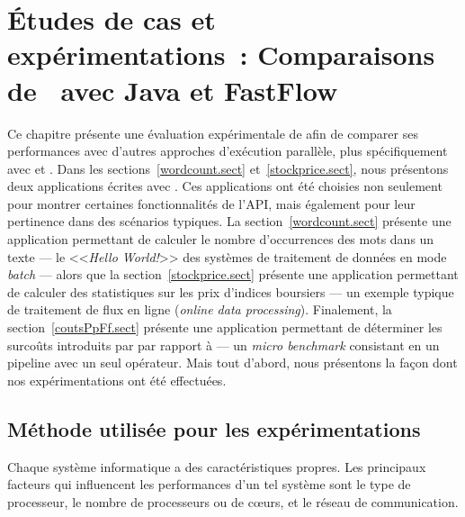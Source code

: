
\chapter{\'Etudes de cas et exp\'erimentations~: Comparaisons de \ppff\ avec Java et FastFlow}
\label{experiences.chap}


Ce chapitre pr\'esente une \'evaluation exp\'erimentale de  afin de comparer ses performances avec d'autres approches d'ex\'ecution parall\`ele, plus sp\'ecifiquement avec  et .
%
Dans les sections~\ref{wordcount.sect} et~\ref{stockprice.sect}, nous pr\'esentons deux applications \'ecrites avec \PpFf. Ces applications ont \'et\'e choisies non seulement pour montrer certaines fonctionnalit\'es de l'API, mais \'egalement pour leur pertinence dans des sc\'enarios typiques. La section~\ref{wordcount.sect} pr\'esente une application permettant de calculer le nombre d'occurrences des mots dans un texte --- le <<\emph{Hello World!}>> des syst\`emes de traitement de donn\'ees en mode \emph{batch} --- alors que la section~\ref{stockprice.sect} pr\'esente une application permettant de calculer des statistiques sur les prix d'indices boursiers --- un exemple typique de traitement de flux en ligne (\emph{online data processing}). Finalement, la section~\ref{coutsPpFf.sect} pr\'esente une application permettant de d\'eterminer les surco\^uts introduits par  par rapport \`a  --- un \emph{micro benchmark} consistant en un pipeline avec un seul op\'erateur. Mais tout d'abord, nous pr\'esentons la fa\c{c}on dont nos exp\'erimentations ont \'et\'e effectu\'ees.

\section{M\'ethode utilis\'ee pour les exp\'erimentations}
\label{usedMethodsForBenchmarks.chap}

Chaque syst\`eme informatique a des caract\'eristiques propres. Les principaux facteurs qui influencent les performances d'un tel syst\`eme sont le type de processeur, le nombre de processeurs ou de c\oe{}urs, et le r\'eseau de communication. 




